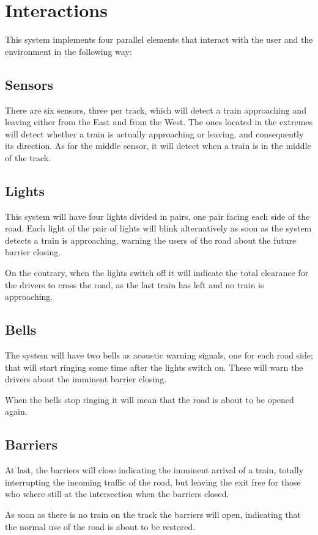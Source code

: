 \documentclass[final]{report}
\begin{document}
\chapter{Interactions}
This system implements four parallel elements that interact with the user and the environment in the following way:

\section{Sensors}
There are six sensors, three per track, which will detect a train approaching and leaving either from the East and from the West.
The ones located in the extremes will detect whether a train is actually approaching or leaving, and consequently its direction.
As for the middle sensor, it will detect when a train is in the middle of the track.

\section{Lights}
This system will have four lights divided in pairs, one pair facing each side of the road.
Each light of the pair of lights will blink alternatively as soon as the system detects a train is approaching, warning the users of the road about the future barrier closing.

On the contrary, when the lights switch off it will indicate the total clearance for the drivers to cross the road, as the last train has left and no train is approaching.

\section{Bells}
The system will have two bells as acoustic warning signals, one for each road side; that will start ringing some time after the lights switch on.
These will warn the drivers about the imminent barrier closing.

When the bells stop ringing it will mean that the road is about to be opened again.

\section{Barriers}
At last, the barriers will close indicating the imminent arrival of a train, totally interrupting the incoming traffic of the road, but leaving the exit free for those who where still at the intersection when the barriers closed.

As soon as there is no train on the track the barriers will open, indicating that the normal use of the road is about to be restored.
\end{document}
